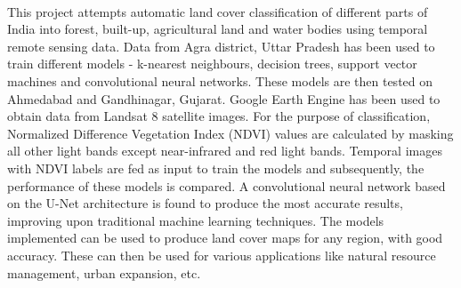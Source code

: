 \documentclass[12pt, a4paper]{report}
\begin{document}
\begin{onehalfspace}
\paragraph{}
This project attempts automatic land cover classification of different parts of India into forest, built-up, agricultural land and water bodies using temporal remote sensing data. Data from Agra district, Uttar Pradesh has been used to train different models - k-nearest neighbours, decision trees, support vector machines and convolutional neural networks. These models are then tested on Ahmedabad and Gandhinagar, Gujarat. Google Earth Engine has been used to obtain data from Landsat 8 satellite images. For the purpose of classification, Normalized Difference Vegetation Index (NDVI) values are calculated by masking all other light bands except near-infrared and red light bands. Temporal images with NDVI labels are fed as input to train the models and subsequently, the performance of these models is compared. A convolutional neural network based on the U-Net architecture is found to produce the most accurate results, improving upon traditional machine learning techniques. The models implemented can be used to produce land cover maps for any region, with good accuracy. These can then be used for various applications like natural resource management, urban expansion, etc.
\end{onehalfspace}
\newpage
\end{document}
